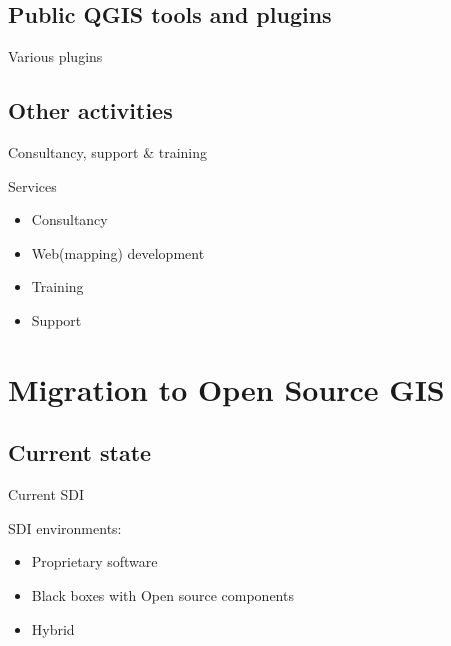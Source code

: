 \subsection{Public QGIS tools and plugins}
\begin{frame}{Various plugins}
\end{frame}

\subsection{Other activities}
\begin{frame}{Consultancy, support \& training}
	\begin{block}{Services}
		\begin{itemize}
			\item Consultancy
			\item Web(mapping) development
			\item Training
			\item Support
		\end{itemize}
	\end{block}
\end{frame}

\section{Migration to Open Source GIS}
\subsection{Current state}
\begin{frame}{Current SDI}
	\begin{block}{SDI environments:}
		\begin{itemize}
			\item Proprietary software
			\item Black boxes with Open source components
			\item Hybrid
		\end{itemize}
	\end{block}
\end{frame}

